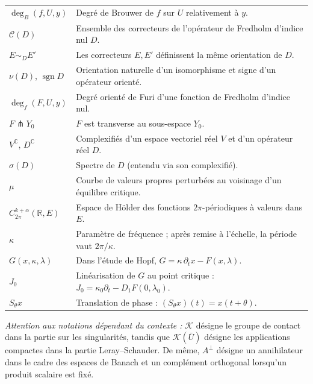\documentclass[memoire.tex]{subfiles}
\begin{document}
\begin{tabular}{@{}p{}p{}@{}}
$\deg_B(f,U,y)$
& Degré de Brouwer de $f$ sur $U$ relativement à $y$.\\
$\mathcal C(D)$
& Ensemble des correcteurs de l'opérateur de Fredholm d'indice nul $D$.\\
$E\sim_D E'$
& Les correcteurs $E,E'$ définissent la même orientation de $D$.\\
$\nu(D)$, $\operatorname{sgn}D$
& Orientation naturelle d'un isomorphisme et signe d'un opérateur orienté.\\
$\deg_f(F,U,y)$
& Degré orienté de Furi d'une fonction de Fredholm d'indice nul.\\
$F\pitchfork Y_0$
& $F$ est transverse au sous-espace $Y_0$.\\[0.2em]
$V^{\mathbb C}$, $D^{\mathbb C}$
& Complexifiés d'un espace vectoriel réel $V$ et d'un opérateur réel $D$.\\
$\sigma(D)$
& Spectre de $D$ (entendu via son complexifié).\\
$\mu$
& Courbe de valeurs propres perturbées au voisinage d'un équilibre critique.\\
$C_{2\pi}^{k+\alpha}(\mathbb R,E)$
& Espace de Hölder des fonctions $2\pi$-périodiques à valeurs dans $E$.\\
$\kappa$
& Paramètre de fréquence ; après remise à l'échelle, la période vaut $2\pi/\kappa$.\\
$G(x,\kappa,\lambda)$
& Dans l'étude de Hopf, $G=\kappa\,\partial_t x-F(x,\lambda)$.\\
$J_0$
& Linéarisation de $G$ au point critique :
$J_0=\kappa_0\partial_t-D_1F(0,\lambda_0)$.\\
$S_\theta x$
& Translation de phase : $(S_\theta x)(t)=x(t+\theta)$.\\
\end{tabular}

\medskip
\noindent\textit{Attention aux notations dépendant du contexte :}
$\mathcal K$ désigne le groupe de contact dans la partie sur les singularités,
tandis que $\mathcal K(\bar U)$ désigne les applications compactes dans la
partie Leray--Schauder. De même, $A^\perp$ désigne un annihilateur dans le cadre
des espaces de Banach et un complément orthogonal lorsqu'un produit scalaire
est fixé.
\end{document}
